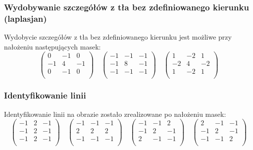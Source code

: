 \documentclass{classrep}
\begin{document}
\subsubsection{Wydobywanie szczegółów z tła bez zdefiniowanego kierunku (laplasjan)}
Wydobycie szczegółów z tła bez zdefiniowanego kierunku jest możliwe przy nałożeniu następujących masek:
\[
 \begin{pmatrix}
  0 & -1 & 0 \\
  -1 & 4 & -1 \\
  0 & -1 & 0 \\
 \end{pmatrix}
\quad
 \begin{pmatrix}
  -1 & -1 & -1 \\
  -1 & 8 & -1 \\
  -1 & -1 & -1 \\
 \end{pmatrix}
\quad
 \begin{pmatrix}
  1 & -2 & 1 \\
  -2 & 4 & -2 \\
  1 & -2 & 1 \\
 \end{pmatrix}
\]

\subsubsection{Identyfikowanie linii}
Identyfikowanie linii na obrazie zostało zrealizowane po nałożeniu masek:
\[
 \begin{pmatrix}
  -1 & 2 & -1 \\
  -1 & 2 & -1 \\
  -1 & 2 & -1 \\
 \end{pmatrix}
\quad
 \begin{pmatrix}
  -1 & -1 & -1 \\
  2 & 2 & 2 \\
 -1 & -1 & -1 \\
 \end{pmatrix}
\quad
 \begin{pmatrix}
  -1 & -1 & 2 \\
  -1 & 2 & -1 \\
  2 & -1 & -1 \\
 \end{pmatrix}
\quad
 \begin{pmatrix}
  2 & -1 & -1 \\
  -1 & 2 & -1 \\
  -1 & -1 & 2 \\
 \end{pmatrix}
\]
\end{document}
